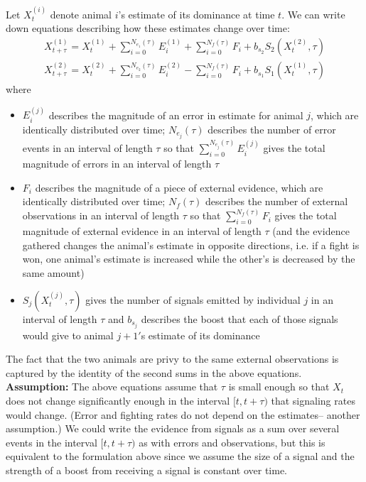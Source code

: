 \documentclass{article}
\begin{document}
Let $X_t^{(i)}$ denote animal $i$'s estimate of its dominance at time $t$.  We can write down equations describing how these estimates change over time:
\begin{align*}
X_{t+\tau}^{(1)}=X_t^{(1)}+\sum_{i=0}^{N_{e_1}(\tau)}E_i^{(1)}+\sum_{i=0}^{N_f(\tau)}F_i+b_{s_2}S_2(X_t^{(2)},\tau)
\\ X_{t+\tau}^{(2)}=X_t^{(2)}+\sum_{i=0}^{N_{e_2}(\tau)}E_i^{(2)}-\sum_{i=0}^{N_f(\tau)}F_i+b_{s_1}S_1(X_t^{(1)},\tau)
\end{align*} 
where
\begin{itemize}
\item $E_i^{(j)}$ describes the magnitude of an error in estimate for animal $j$, which are identically distributed over time; $N_{e_j}(\tau)$ describes the number of error events in an interval of length $\tau$ so that $\sum_{i=0}^{N_{e_j}(\tau)}E_i^{(j)}$ gives the total magnitude of errors in an interval of length $\tau$

\item $F_i$ describes the magnitude of a piece of external evidence, which are identically distributed over time; $N_f(\tau)$ describes the number of external observations in an interval of length $\tau$ so that $\sum_{i=0}^{N_f(\tau)}F_i$ gives the total magnitude of external evidence in an interval of length $\tau$ (and the evidence gathered changes the animal's estimate in opposite directions, i.e. if a fight is won, one animal's estimate is increased while the other's is decreased by the same amount)

\item $S_j(X_t^{(j)},\tau)$ gives the number of signals emitted by individual $j$ in an interval of length $\tau$ and $b_{s_j}$ describes the boost that each of those signals would give to animal $j+1'$s estimate of its dominance

\end{itemize}
The fact that the two animals are privy to the same external observations is captured by the identity of the second sums in the above equations.  {\bf Assumption:} The above equations assume that $\tau$ is small enough so that $X_t$ does not change significantly enough in the interval $[t,t+\tau)$ that signaling rates would change.  (Error and fighting rates do not depend on the estimates-- another assumption.)  We could write the evidence from signals as a sum over several events in the interval $[t,t+\tau)$ as with errors and observations, but this is equivalent to the formulation above since we assume the size of a signal and the strength of a boost from receiving a signal is constant over time.  
\end{document}
